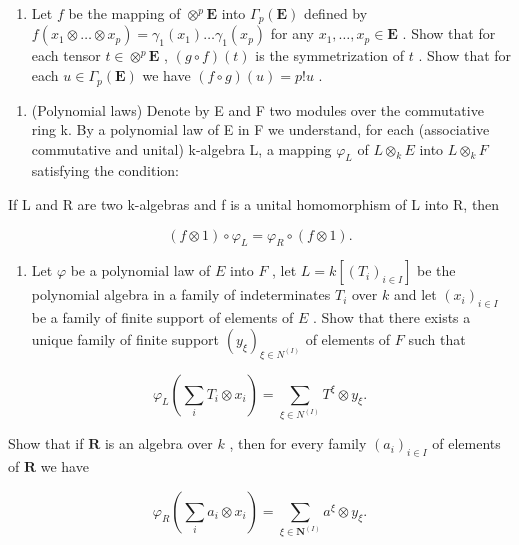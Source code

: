 \begin{enumerate}
\def\labelenumi{\alph{enumi})}
\setcounter{enumi}{2}
\tightlist
\item
  Let \(f\) be the mapping of \(\otimes^p \mathbf{E}\) into \(\Gamma_p(\mathbf{E})\) defined by \(f(x_1 \otimes \ldots \otimes x_p) = \gamma_1(x_1) \ldots \gamma_1(x_p)\) for any \(x_1, \ldots, x_p \in \mathbf{E}\) . Show that for each tensor \(t \in \otimes^p \mathbf{E}\) , \((g \circ f)(t)\) is the symmetrization of \(t\) . Show that for each \(u \in \Gamma_p(\mathbf{E})\) we have \((f \circ g)(u) = p! u\) .
\end{enumerate}

\begin{enumerate}
\def\labelenumi{\arabic{enumi})}
\setcounter{enumi}{8}
\tightlist
\item
  (Polynomial laws) Denote by E and F two modules over the commutative ring k. By a polynomial law of E in F we understand, for each (associative commutative and unital) k-algebra L, a mapping \(\varphi_{L}\) of \(L \otimes_{k} E\) into \(L \otimes_{k} F\) satisfying the condition:
\end{enumerate}

If L and R are two k-algebras and f is a unital homomorphism of L into R, then

\[
(f \otimes 1) \circ \varphi_ {L} = \varphi_ {R} \circ (f \otimes 1).
\]

\begin{enumerate}
\def\labelenumi{\alph{enumi})}
\tightlist
\item
  Let \(\varphi\) be a polynomial law of \(E\) into \(F\) , let \(L = k[(T_i)_{i \in I}]\) be the polynomial algebra in a family of indeterminates \(T_i\) over \(k\) and let \((x_i)_{i \in I}\) be a family of finite support of elements of \(E\) . Show that there exists a unique family of finite support \((y_\xi)_{\xi \in N^{(I)}}\) of elements of \(F\) such that
\end{enumerate}

\[
\varphi_ {L} \left(\sum_ {i} T _ {i} \otimes x _ {i}\right) = \sum_ {\xi \in N ^ {(I)}} T ^ {\xi} \otimes y _ {\xi}.
\]

Show that if \(\mathbf{R}\) is an algebra over \(k\) , then for every family \((a_i)_{i \in I}\) of elements of \(\mathbf{R}\) we have

\[
\varphi_ {R} \left(\sum_ {i} a _ {i} \otimes x _ {i}\right) = \sum_ {\xi \in \mathbf {N} ^ {(I)}} a ^ {\xi} \otimes y _ {\xi}.\tag{1}
\]

